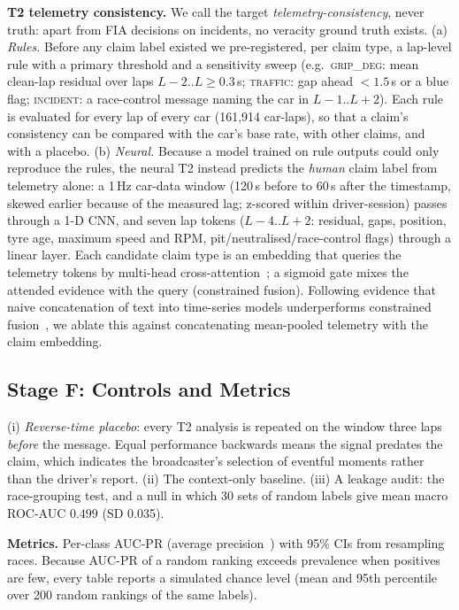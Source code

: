 \textbf{T2 telemetry consistency.} We call the target \emph{telemetry-consistency}, never truth: apart from FIA decisions on incidents, no veracity ground truth exists. (a) \emph{Rules.} Before any claim label existed we pre-registered, per claim type, a lap-level rule with a primary threshold and a sensitivity sweep (e.g.\ \textsc{grip\_deg}: mean clean-lap residual over laps $L{-}2..L \geq 0.3$\,s; \textsc{traffic}: gap ahead $<1.5$\,s or a blue flag; \textsc{incident}: a race-control message naming the car in $L{-}1..L{+}2$). Each rule is evaluated for every lap of every car (161{,}914 car-laps), so that a claim's consistency can be compared with the car's base rate, with other claims, and with a placebo. (b) \emph{Neural.} Because a model trained on rule outputs could only reproduce the rules, the neural T2 instead predicts the \emph{human} claim label from telemetry alone: a 1\,Hz car-data window (120\,s before to 60\,s after the timestamp, skewed earlier because of the measured lag; z-scored within driver-session) passes through a 1-D CNN, and seven lap tokens ($L{-}4..L{+}2$: residual, gaps, position, tyre age, maximum speed and RPM, pit/neutralised/race-control flags) through a linear layer. Each candidate claim type is an embedding that queries the telemetry tokens by multi-head cross-attention~\cite{vaswani2017attention}; a sigmoid gate mixes the attended evidence with the query (constrained fusion). Following evidence that naive concatenation of text into time-series models underperforms constrained fusion~\cite{lee2026cfa}, we ablate this against concatenating mean-pooled telemetry with the claim embedding.

\subsection{Stage F: Controls and Metrics}
(i) \emph{Reverse-time placebo}: every T2 analysis is repeated on the window three laps \emph{before} the message. Equal performance backwards means the signal predates the claim, which indicates the broadcaster's selection of eventful moments rather than the driver's report. (ii) The context-only baseline. (iii) A leakage audit: the race-grouping test, and a null in which 30 sets of random labels give mean macro ROC-AUC $0.499$ (SD 0.035).

\textbf{Metrics.} Per-class AUC-PR (average precision~\cite{davis2006prroc,saito2015pr}) with 95\% CIs from resampling races. Because AUC-PR of a random ranking exceeds prevalence when positives are few, every table reports a simulated chance level (mean and 95th percentile over 200 random rankings of the same labels).


